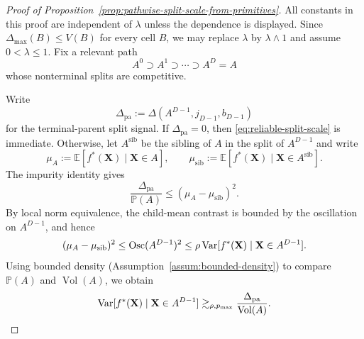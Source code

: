 \documentclass[11pt]{article}
\theoremstyle{plain}
\theoremstyle{definition}
\theoremstyle{remark}
\theoremstyle{plain}
\newcommand{\bX}{\mathbf{X}}
\renewcommand{\P}{\mathbb{P}}
\newcommand{\E}{\mathbb{E}}
\newcommand{\Var}{\textnormal{Var}}
\DeclareMathOperator{\Vol}{Vol}
\newcommand{\1}{\mathbbm{1}}
\newcommand{\Osc}{\operatorname{Osc}}
\begin{document}
\begin{proof}[Proof of Proposition~\ref{prop:pathwise-split-scale-from-primitives}]
All constants in this proof are independent of $\lambda$ unless the dependence is displayed.
Since $\Delta_{\max}(B)\le V(B)$ for every cell $B$, we may replace $\lambda$ by $\lambda\wedge1$ and assume $0<\lambda\le1$.
Fix a relevant path
\[
A^0\supset A^1\supset\cdots\supset A^D=A
\]
whose nonterminal splits are competitive.

Write
\[
\Delta_{\mathrm{pa}}
:=
\Delta(A^{D-1},j_{D-1},b_{D-1})
\]
for the terminal-parent split signal.
If $\Delta_{\mathrm{pa}}=0$, then \eqref{eq:reliable-split-scale} is immediate. Otherwise, let $A^{\mathrm{sib}}$ be the sibling of $A$ in the split of $A^{D-1}$ and write
\[
\mu_A:=\E[f^*(\bX)\mid \bX\in A],
\qquad
\mu_{\mathrm{sib}}:=\E[f^*(\bX)\mid \bX\in A^{\mathrm{sib}}].
\]
The impurity identity gives
\[
\frac{\Delta_{\mathrm{pa}}}{\P(A)}
\le
(\mu_A-\mu_{\mathrm{sib}})^2.
\]
By local norm equivalence, the child-mean contrast is bounded by the oscillation on $A^{D-1}$, and hence
\[
(\mu_A-\mu_{\mathrm{sib}})^2
\le
\Osc(A^{D-1})^2
\le
\rho\,\Var[f^*(\bX)\mid\bX\in A^{D-1}].
\]
Using bounded density (Assumption~\ref{assum:bounded-density}) to compare $\P(A)$ and $\Vol(A)$, we obtain
\[
\Var[f^*(\bX)\mid\bX\in A^{D-1}]
\gtrsim_{\rho,p_{\max}}
\frac{\Delta_{\mathrm{pa}}}{\Vol(A)}.
\]


\end{proof}
\end{document}
